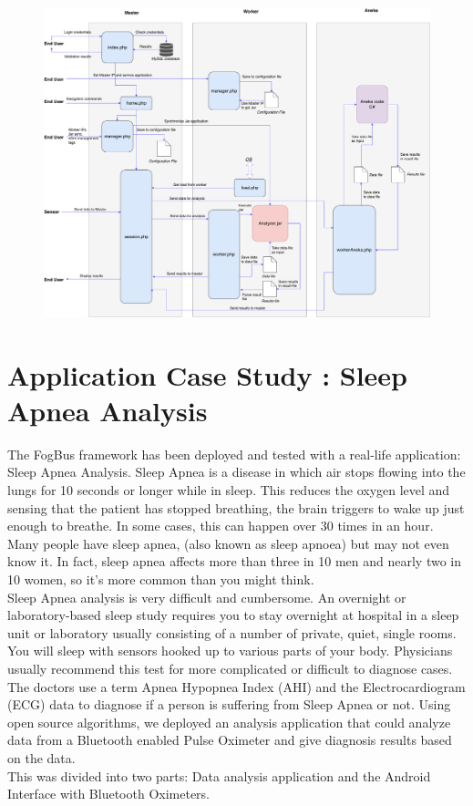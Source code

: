 \documentclass[AMA,STIX1COL]{WileyNJD-v2}
\begin{document}
\begin{figure}[h]
\centering
\includegraphics[width=\textwidth]{working}
\end{figure}

\section{Application Case Study : Sleep Apnea Analysis}
The FogBus framework has been deployed and tested with a real-life application: Sleep Apnea Analysis. Sleep Apnea is a disease in which air stops flowing into the lungs for 10 seconds or longer while in sleep. This reduces the oxygen level and sensing that the patient has stopped breathing, the brain triggers to wake up just enough to breathe. In some cases, this can happen over 30 times in an hour. Many people have sleep apnea, (also known as sleep apnoea) but may not even know it. In fact, sleep apnea affects more than three in 10 men and nearly two in 10 women, so it's more common than you might think. \\
Sleep Apnea analysis is very difficult and cumbersome. An overnight or laboratory-based sleep study requires you to stay overnight at hospital in a sleep unit or laboratory usually consisting of a number of private, quiet, single rooms.  You will sleep with sensors hooked up to various parts of your body.  Physicians usually recommend this test for more complicated or difficult to diagnose cases.\\
The doctors use a term Apnea Hypopnea Index (AHI) and the Electrocardiogram (ECG) data to diagnose if a person is suffering from Sleep Apnea or not. Using open source algorithms, we deployed an analysis application that could analyze data from a Bluetooth enabled Pulse Oximeter and give diagnosis results based on the data.\\
This was divided into two parts: Data analysis application and the Android Interface with Bluetooth Oximeters.
\end{document}
